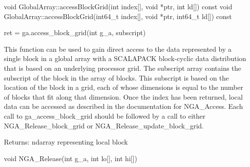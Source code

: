 \documentclass[10pt]{article}
\begin{document}
\begin{cxxapi}
\begin{cxxcode}
void GlobalArray::accessBlockGrid(int index[], void *ptr, int ld[]) const
void GlobalArray::accessBlockGrid(int64_t index[], void *ptr, int64_t ld[])
                                  const
\end{cxxcode}
\begin{funcargs}
\end{funcargs}
\end{cxxapi}

\begin{pyapi}
\begin{pycode}
ret = ga.access_block_grid(int g_a, subscript)
\end{pycode}
\begin{funcargs}
\end{funcargs}
\end{pyapi}

\local

\begin{desc}

This function can be used to gain direct access to the data represented by a
single block in a global array with a SCALAPACK block-cyclic data distribution
that is based on an underlying processor grid. The subscript array contains the
subscript of the block in the array of blocks. This subscript is based on the
location of the block in a grid, each of whose dimensions is equal to the
number of blocks that fit along that dimension. Once the index has been
returned, local data can be accessed as described in the documentation for
NGA_Access. Each call to ga_access_block_grid should be followed by a call to
either NGA_Release_block_grid or NGA_Release_update_block_grid.

Returns: ndarray representing local block

\end{desc}



\begin{capi}
\begin{ccode}
void NGA_Release(int g_a, int lo[], int hi[])
\end{ccode}
\begin{funcargs}
\end{funcargs}
\end{capi}
\end{document}
